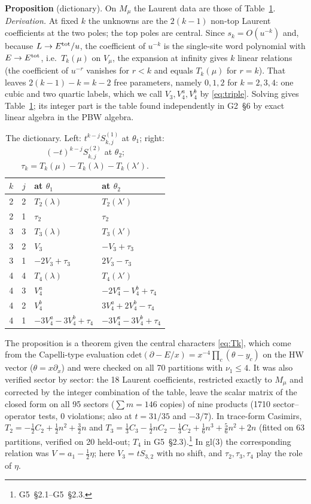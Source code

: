 \documentclass[11pt]{article}
\newcommand{\rg}[2]{\textsf{G#1}~\S#2}
\begin{document}
\textbf{Proposition} (dictionary).
On $M_\mu$ the Laurent data are those of Table~\ref{tab:dict}.
\emph{Derivation.} At fixed $k$ the unknowns are the $2(k-1)$ non-top Laurent coefficients at the two poles; the top poles are central.
Since $s_k=O(u^{-k})$ and, because $L\to E^{\rm tot}/u$, the coefficient of $u^{-k}$ is the single-site word polynomial with $E\to E^{\rm tot}$, i.e.\ $T_k(\mu)$ on $V_\mu$, the expansion at infinity gives $k$ linear relations (the coefficient of $u^{-r}$ vanishes for $r<k$ and equals $T_k(\mu)$ for $r=k$).
That leaves $2(k-1)-k=k-2$ free parameters, namely $0,1,2$ for $k=2,3,4$: one cubic and two quartic labels, which we call $V_3,V_4^a,V_4^b$ by \eqref{eq:triple}.
Solving gives Table~\ref{tab:dict}; its integer part is the table found independently in \rg{2}{6} by exact linear algebra in the PBW algebra.

\begin{table}[htbp]
\centering\small
\caption{The dictionary. Left: $t^{k-j}S^{(1)}_{k,j}$ at $\theta_1$; right: $(-t)^{k-j}S^{(2)}_{k,j}$ at $\theta_2$; $\tau_k=T_k(\mu)-T_k(\lambda)-T_k(\lambda')$.}
\label{tab:dict}
\begin{tabular}{@{}cc@{\qquad}l@{\qquad}l@{}}
\toprule
$k$ & $j$ & at $\theta_1$ & at $\theta_2$ \\
\midrule
2 & 2 & $T_2(\lambda)$ & $T_2(\lambda')$ \\
2 & 1 & $\tau_2$ & $\tau_2$ \\
3 & 3 & $T_3(\lambda)$ & $T_3(\lambda')$ \\
3 & 2 & $V_3$ & $-V_3+\tau_3$ \\
3 & 1 & $-2V_3+\tau_3$ & $2V_3-\tau_3$ \\
4 & 4 & $T_4(\lambda)$ & $T_4(\lambda')$ \\
4 & 3 & $V_4^a$ & $-2V_4^a-V_4^b+\tau_4$ \\
4 & 2 & $V_4^b$ & $3V_4^a+2V_4^b-\tau_4$ \\
4 & 1 & $-3V_4^a-3V_4^b+\tau_4$ & $-3V_4^a-3V_4^b+\tau_4$ \\
\bottomrule
\end{tabular}
\end{table}

The proposition is a theorem given the central characters \eqref{eq:Tk}, which come from the Capelli-type evaluation $\mathrm{cdet}(\partial-E/x)=x^{-4}\prod_c(\theta-y_c)$ on the HW vector ($\theta=x\partial_x$) and were checked on all 70 partitions with $\nu_1\le4$.
It was also verified sector by sector: the 18 Laurent coefficients, restricted exactly to $M_\mu$ and corrected by the integer combination of the table, leave the scalar matrix of the closed form on all 95 sectors ($\sum m=146$ copies) of nine products (1710 sector--operator tests, 0 violations; also at $t=31/35$ and $-3/7$).
In trace-form Casimirs, $T_2=-\tfrac12C_2+\tfrac12n^2+\tfrac32n$ and $T_3=\tfrac13C_3-\tfrac12nC_2-\tfrac13C_2+\tfrac16n^3+\tfrac56n^2+2n$ (fitted on 63 partitions, verified on 20 held-out; $T_4$ in \rg{5}{2.3}).\footnote{\rg{5}{2.1}--\rg{5}{2.3}.}
In gl(3) the corresponding relation was $V=a_1-\tfrac12\eta$; here $V_3=tS_{3,2}$ with no shift, and $\tau_2,\tau_3,\tau_4$ play the role of $\eta$.
\end{document}
